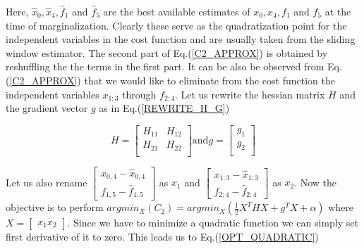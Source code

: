 Here, $\hat x_0, \hat x_4, \hat f_1$ and $\hat f_5$ are the best available estimates of $x_0, x_4, f_1$ and $f_5$ at the time of marginalization. Clearly these serve as the quadratization point for the independent variables in the cost function and are usually taken from the sliding window estimator. The second part of Eq.(\ref{C2_APPROX}) is obtained by reshuffling the the terms in the first part. It can be also be observed from Eq.(\ref{C2_APPROX}) that we would like to eliminate from the cost function the independent variables $x_{1:3}$ through $f_{2:4}$. Let us rewrite the hessian matrix $H$ and the gradient vector $g$ as in Eq.(\ref{REWRITE_H_G})

\begin{subequations}
\begin{equation}
H = \begin{bmatrix} 
			H_{11} & H_{12} \\
			H_{21} & H_{22} \\
		\end{bmatrix} 
\end{equation}
\text{and}

\begin{equation}
g = \begin{bmatrix} 
			g_{1} \\
			g_{2} \\
		\end{bmatrix}
\end{equation}
\label{REWRITE_H_G}
\end{subequations}

Let us also rename $\begin{bmatrix} x_{0, 4} - \hat x_{0, 4} \\ f_{1, 5} - \hat f_{1, 5} \end{bmatrix}$ as $x_1$ and $\begin{bmatrix} x_{1:3} - \hat x_{1:3} \\ f_{2:4} - \hat f_{2:4} \end{bmatrix}$ as $x_2$. Now the objective is to perform $argmin_X(C_2) = argmin_X(\frac{1}{2}X^THX + g^TX + \alpha)$ where $X = \begin{bmatrix} x_1 x_2 \end{bmatrix}$. Since we have to minimize a quadratic function we can simply set first derivative of it to zero. This leads us to Eq.(\ref{OPT_QUADRATIC})

